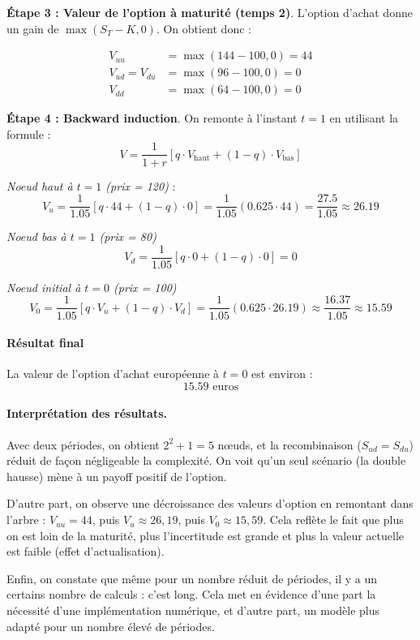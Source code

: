 \documentclass[12pt,a4paper]{article}
\begin{document}
\noindent \textbf{Étape 3 : Valeur de l’option à maturité (temps 2)}. L’option d’achat donne un gain de $\max(S_T - K, 0)$. On obtient donc :

\[
\begin{aligned}
V_{uu} &= \max(144 - 100, 0) = 44 \\
V_{ud} = V_{du} &= \max(96 - 100, 0) = 0 \\
V_{dd} &= \max(64 - 100, 0) = 0
\end{aligned}
\]

\noindent \textbf{Étape 4 : Backward induction}. On remonte à l’instant $t=1$ en utilisant la formule :
\[
V = \frac{1}{1 + r} \left[ q \cdot V_\text{haut} + (1 - q) \cdot V_\text{bas} \right]
\]

\textit{Noeud haut à $t=1$ (prix = 120)} :
\[
V_u = \frac{1}{1.05} \left[ q \cdot 44 + (1 - q) \cdot 0 \right] = \frac{1}{1.05} (0.625 \cdot 44) = \frac{27.5}{1.05} \approx 26.19
\]

\textit{Noeud bas à $t=1$ (prix = 80)}
\[
V_d = \frac{1}{1.05} \left[ q \cdot 0 + (1 - q) \cdot 0 \right] = 0
\]

\textit{Noeud initial à $t=0$ (prix = 100)}
\[
V_0 = \frac{1}{1.05} \left[ q \cdot V_u + (1 - q) \cdot V_d \right] = \frac{1}{1.05} (0.625 \cdot 26.19) \approx \frac{16.37}{1.05} \approx 15.59
\]

\paragraph{Résultat final} La valeur de l’option d’achat européenne à $t=0$ est environ :
\[\boxed{15.59 \text{ euros}}\]

\paragraph{Interprétation des résultats.} Avec deux périodes, on obtient \( 2^2 + 1 = 5 \) nœuds, et la recombinaison (\( S_{ud} = S_{du} \)) réduit de façon négligeable la complexité. On voit qu’un seul scénario (la double hausse) mène à un payoff positif de l’option.

D'autre part, on observe une décroissance des valeurs d’option en remontant dans l’arbre : \( V_{uu} = 44 \), puis \( V_u \approx 26{,}19 \), puis \( V_0 \approx 15{,}59 \). Cela reflète le fait que plus on est loin de la maturité, plus l'incertitude est grande et plus la valeur actuelle est faible (effet d’actualisation).
    
Enfin, on constate que même pour un nombre réduit de périodes, il y a un certains nombre de calculs : c'est long. Cela met en évidence d'une part la nécessité d'une implémentation numérique, et d'autre part, un modèle plus adapté pour un nombre élevé de périodes.
\end{document}
